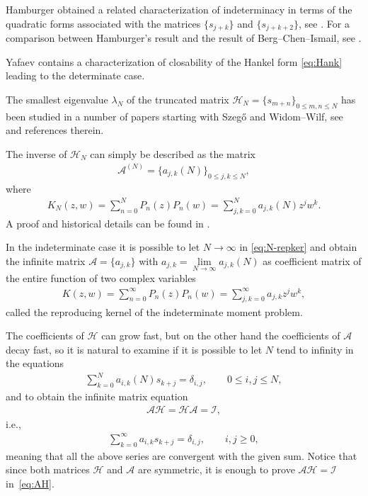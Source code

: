 Hamburger obtained a related characterization of indeterminacy in terms of the quadratic forms associated with the matrices $\{s_{j+k}\}$ and $\{s_{j+k+2}\}$, see \cite[p.~70]{S:T}. For a comparison between Hamburger's result and the result of Berg--Chen--Ismail, see \cite{B:C:I}.

Yafaev \cite{Y} contains a characterization of closability of the Hankel form \eqref{eq:Hank} leading to the determinate case.

The smallest eigenvalue $\lambda_N$ of the truncated matrix $\mathcal{H}_N=\{s_{m+n}\}_{0\le m,n\le N}$ has been studied in a number of papers starting with Szeg\H{o} and Widom--Wilf, see~\cite{B:S1} and references therein.

The inverse of $\mathcal H_N$ can simply be described as the matrix
\begin{gather*}
\mathcal A^{(N)}=\{a_{j,k}(N)\}_{0\le j,k\le N},
\end{gather*}
where
\begin{gather}\label{eq:N-repker}
K_N(z,w)=\sum_{n=0}^NP_n(z)P_n(w)=\sum_{j,k=0}^N a_{j,k}(N)z^jw^k.
\end{gather}
A proof and historical details can be found in \cite[Theorem~1.1]{B:S1}.

In the indeterminate case it is possible to let $N\to \infty$ in \eqref{eq:N-repker} and obtain the infinite matrix $\mathcal A=\{a_{j,k}\}$ with $a_{j,k}=\lim\limits_{N\to\infty}a_{j,k}(N)$ as coefficient matrix of the entire function of two complex variables
\begin{gather*}
K(z,w)=\sum_{n=0}^\infty P_n(z)P_n(w)=\sum_{j,k=0}^\infty a_{j,k}z^jw^k,
\end{gather*}
called the reproducing kernel of the indeterminate moment problem.

The coefficients of $\mathcal H$ can grow fast, but on the other hand the coefficients of $\mathcal A$ decay fast, so it is natural to examine if it is possible to let $N$ tend to infinity in the equations
\begin{gather*}
\sum_{k=0}^N a_{i,k}(N)s_{k+j}=\delta_{i,j},\qquad 0\le i,j\le N,
\end{gather*}
and to obtain the infinite matrix equation
\begin{gather}\label{eq:AH}
\mathcal A\mathcal H=\mathcal H\mathcal A=\mathcal I,
\end{gather}
i.e.,
\begin{gather}\label{eq:AH1}
\sum_{k=0}^\infty a_{i,k}s_{k+j} =\delta_{i,j},\qquad i,j \ge 0,
\end{gather}
meaning that all the above series are convergent with the given sum.
Notice that since both matrices $\mathcal H$ and $\mathcal A$ are symmetric, it is enough to prove $\mathcal A\mathcal H=\mathcal I$ in~\eqref{eq:AH}.

